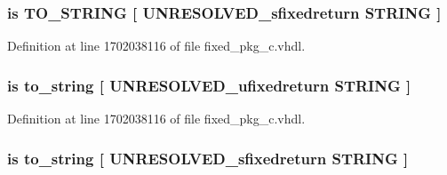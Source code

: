 \subsubsection[{T\+O\+\_\+\+B\+I\+N\+A\+R\+Y\+\_\+\+S\+T\+R\+I\+N\+G}]{ {\bfseries \textcolor{keywordflow}{is}\textcolor{vhdlchar}{ }\textcolor{vhdlchar}{T\+O\+\_\+\+S\+T\+R\+I\+N\+G}\textcolor{vhdlchar}{ }\textcolor{vhdlchar}{\mbox{[}}\textcolor{vhdlchar}{ }\textcolor{vhdlchar}{U\+N\+R\+E\+S\+O\+L\+V\+E\+D\+\_\+sfixedreturn}\textcolor{vhdlchar}{ }\textcolor{comment}{S\+T\+R\+I\+N\+G}\textcolor{vhdlchar}{ }\textcolor{vhdlchar}{\mbox{]}}\textcolor{vhdlchar}{ }} \hspace{0.3cm}{\ttfamily [Alias]}}\label{classfixed__pkg_acb48821e2a7afd56952fba94ebfa178d}


Definition at line 1702038116 of file fixed\+\_\+pkg\+\_\+c.\+vhdl.

\hypertarget{classfixed__pkg_ae7de5f0a1ca9e038b33dac7c8680a1e2}{}
\subsubsection[{to\+\_\+bstring}]{ {\bfseries \textcolor{keywordflow}{is}\textcolor{vhdlchar}{ }\textcolor{vhdlchar}{to\+\_\+string}\textcolor{vhdlchar}{ }\textcolor{vhdlchar}{\mbox{[}}\textcolor{vhdlchar}{ }\textcolor{vhdlchar}{U\+N\+R\+E\+S\+O\+L\+V\+E\+D\+\_\+ufixedreturn}\textcolor{vhdlchar}{ }\textcolor{comment}{S\+T\+R\+I\+N\+G}\textcolor{vhdlchar}{ }\textcolor{vhdlchar}{\mbox{]}}\textcolor{vhdlchar}{ }} \hspace{0.3cm}{\ttfamily [Alias]}}\label{classfixed__pkg_ae7de5f0a1ca9e038b33dac7c8680a1e2}


Definition at line 1702038116 of file fixed\+\_\+pkg\+\_\+c.\+vhdl.

\hypertarget{classfixed__pkg_ab0df1e66ba14653bc1c17d30b9c54ab3}{}
\subsubsection[{to\+\_\+bstring}]{ {\bfseries \textcolor{keywordflow}{is}\textcolor{vhdlchar}{ }\textcolor{vhdlchar}{to\+\_\+string}\textcolor{vhdlchar}{ }\textcolor{vhdlchar}{\mbox{[}}\textcolor{vhdlchar}{ }\textcolor{vhdlchar}{U\+N\+R\+E\+S\+O\+L\+V\+E\+D\+\_\+sfixedreturn}\textcolor{vhdlchar}{ }\textcolor{comment}{S\+T\+R\+I\+N\+G}\textcolor{vhdlchar}{ }\textcolor{vhdlchar}{\mbox{]}}\textcolor{vhdlchar}{ }} \hspace{0.3cm}{\ttfamily [Alias]}}\label{classfixed__pkg_ab0df1e66ba14653bc1c17d30b9c54ab3}


